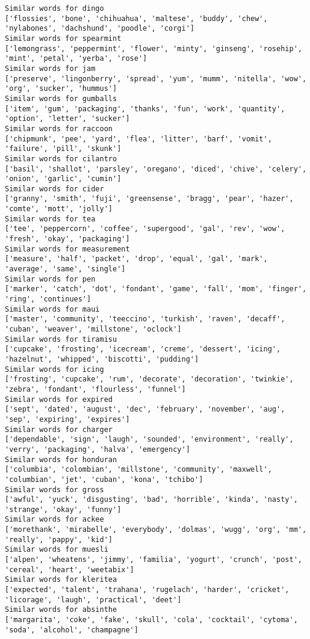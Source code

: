 \documentclass[11pt]{article}
\begin{document}
\begin{Verbatim}[commandchars=\\\{\}]
Similar words for dingo
['flossies', 'bone', 'chihuahua', 'maltese', 'buddy', 'chew', 'nylabones', 'dachshund', 'poodle', 'corgi']
Similar words for spearmint
['lemongrass', 'peppermint', 'flower', 'minty', 'ginseng', 'rosehip', 'mint', 'petal', 'yerba', 'rose']
Similar words for jam
['preserve', 'lingonberry', 'spread', 'yum', 'mumm', 'nitella', 'wow', 'org', 'sucker', 'hummus']
Similar words for gumballs
['item', 'gum', 'packaging', 'thanks', 'fun', 'work', 'quantity', 'option', 'letter', 'sucker']
Similar words for raccoon
['chipmunk', 'pee', 'yard', 'flea', 'litter', 'barf', 'vomit', 'failure', 'pill', 'skunk']
Similar words for cilantro
['basil', 'shallot', 'parsley', 'oregano', 'diced', 'chive', 'celery', 'onion', 'garlic', 'cumin']
Similar words for cider
['granny', 'smith', 'fuji', 'greensense', 'bragg', 'pear', 'hazer', 'comte', 'mott', 'jolly']
Similar words for tea
['tee', 'peppercorn', 'coffee', 'supergood', 'gal', 'rev', 'wow', 'fresh', 'okay', 'packaging']
Similar words for measurement
['measure', 'half', 'packet', 'drop', 'equal', 'gal', 'mark', 'average', 'same', 'single']
Similar words for pen
['marker', 'catch', 'dot', 'fondant', 'game', 'fall', 'mom', 'finger', 'ring', 'continues']
Similar words for maui
['master', 'community', 'teeccino', 'turkish', 'raven', 'decaff', 'cuban', 'weaver', 'millstone', 'oclock']
Similar words for tiramisu
['cupcake', 'frosting', 'icecream', 'creme', 'dessert', 'icing', 'hazelnut', 'whipped', 'biscotti', 'pudding']
Similar words for icing
['frosting', 'cupcake', 'rum', 'decorate', 'decoration', 'twinkie', 'zebra', 'fondant', 'flourless', 'funnel']
Similar words for expired
['sept', 'dated', 'august', 'dec', 'february', 'november', 'aug', 'sep', 'expiring', 'expires']
Similar words for charger
['dependable', 'sign', 'laugh', 'sounded', 'environment', 'really', 'verry', 'packaging', 'halva', 'emergency']
Similar words for honduran
['columbia', 'colombian', 'millstone', 'community', 'maxwell', 'columbian', 'jet', 'cuban', 'kona', 'tchibo']
Similar words for gross
['awful', 'yuck', 'disgusting', 'bad', 'horrible', 'kinda', 'nasty', 'strange', 'okay', 'funny']
Similar words for ackee
['morethank', 'mirabelle', 'everybody', 'dolmas', 'wugg', 'org', 'mm', 'really', 'pappy', 'kid']
Similar words for muesli
['alpen', 'wheatens', 'jimmy', 'familia', 'yogurt', 'crunch', 'post', 'cereal', 'heart', 'weetabix']
Similar words for kleritea
['expected', 'talent', 'trahana', 'rugelach', 'harder', 'cricket', 'licorage', 'laugh', 'practical', 'deet']
Similar words for absinthe
['margarita', 'coke', 'fake', 'skull', 'cola', 'cocktail', 'cytoma', 'soda', 'alcohol', 'champagne']

\end{Verbatim}
\end{document}

